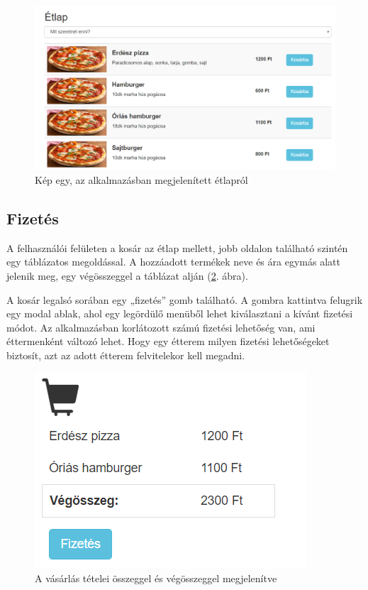 \begin{figure}
\centering
\includegraphics[scale=0.5]{kepek/menu.png}
\caption{Kép egy, az alkalmazásban megjelenített étlapról}
\label{fig:menu}
\end{figure}

\subsection{Fizetés}

A felhasználói felületen a kosár az étlap mellett, jobb oldalon található szintén egy táblázatos megoldással. A hozzáadott termékek neve és ára egymás alatt jelenik meg, egy végösszeggel a táblázat alján (\ref{fig:order}. ábra).

A kosár legalsó sorában egy „fizetés” gomb található. A gombra kattintva felugrik egy modal ablak, ahol egy legördülő menüből lehet kiválasztani a kívánt fizetési módot. Az alkalmazásban korlátozott számú fizetési lehetőség van, ami éttermenként változó lehet. Hogy egy étterem milyen fizetési lehetőségeket biztosít, azt az adott étterem felvitelekor kell megadni.

\begin{figure}
\centering
\includegraphics[scale=0.8]{kepek/order.png}
\caption{A vásárlás tételei összeggel és végösszeggel megjelenítve}
\label{fig:order}
\end{figure}

